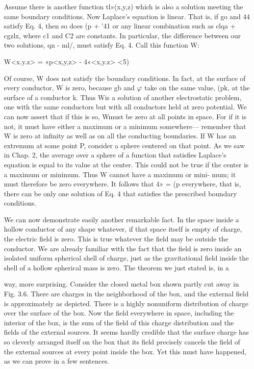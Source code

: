 Assume there is another function tl»(x,y,z) which is also a solution
meeting the same boundary conditions. Now Laplace's equation is
linear. That is, if go and 44 satisfy Eq. 4, then so does (p + '41 or any
linear combination such as clqa + cgzlx, where c1 and C2 are constants.
In particular, the difference between our two solutions, qn - ml/, must
satisfy Eq. 4. Call this function W:

W<x.y.z> = «p<x,y,z> - 4«<x,y.z> <5)

Of course, W does not satisfy the boundary conditions. In fact, at
the surface of every conductor, W is zero, because gb and $\varphi$ take on
the same value, (pk, at the surface of a conductor k. Thus Wis a solution
of another electrostatic problem, one with the same conductors
but with all conductors held at zero potential. We can now assert
that if this is so, Wmust be zero at all points in space. For if it is not,
it must have either a maximum or a minimum somewhere---
remember that W is zero at infinity as well as on all the conducting
boundaries. If W has an extremum at some point P, consider a
sphere centered on that point. As we saw in Chap. 2, the average
over a sphere of a function that satisfies Laplace's equation is equal
to its value at the center. This could not be true if the center is a
maximum or minimum. Thus W cannot have a maximum or mini-
mum; it must therefore be zero everywhere. It follows that 4» = (p
everywhere, that is, there can be only one solution of Eq. 4 that
satisfies the prescribed boundary conditions.

We can now demonstrate easily another remarkable fact. In the
space inside a hollow conductor of any shape whatever, if that space
itself is empty of charge, the electric field is zero. This is true whatever
the field may be outside the conductor. We are already familiar
with the fact that the field is zero inside an isolated uniform spherical
shell of charge, just as the gravitational field inside the shell of a
hollow spherical mass is zero. The theorem we just stated is, in a

way, more surprising. Consider the closed metal box shown partly
cut away in Fig. 3.6. There are charges in the neighborhood of the
box, and the external field is approximately as depicted. There is a
highly nonuniform distribution of charge over the surface of the box.
Now the field everywhere in space, including the interior of the box,
is the sum of the field of this charge distribution and the fields of the
external sources. It seems hardly credible that the surface charge
has so cleverly arranged itself on the box that its field precisely cancels
the field of the external sources at every point inside the box. Yet
this must have happened, as we can prove in a few sentences.

